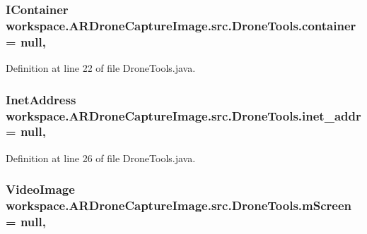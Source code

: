 \subsubsection[{container}]{\setlength{\rightskip}{0pt plus 5cm}I\+Container workspace.\+A\+R\+Drone\+Capture\+Image.\+src.\+Drone\+Tools.\+container = null\hspace{0.3cm}{\ttfamily [static]}, {\ttfamily [private]}}\label{classworkspace_1_1_a_r_drone_capture_image_1_1src_1_1_drone_tools_a1c1b1c9966fa3b80bb679d60c9b93c4d}


Definition at line 22 of file Drone\+Tools.\+java.

\hypertarget{classworkspace_1_1_a_r_drone_capture_image_1_1src_1_1_drone_tools_a537370a44b88d1ed55ee857b7dbf97e1}{}
\subsubsection[{inet\+\_\+addr}]{\setlength{\rightskip}{0pt plus 5cm}Inet\+Address workspace.\+A\+R\+Drone\+Capture\+Image.\+src.\+Drone\+Tools.\+inet\+\_\+addr = null\hspace{0.3cm}{\ttfamily [static]}, {\ttfamily [private]}}\label{classworkspace_1_1_a_r_drone_capture_image_1_1src_1_1_drone_tools_a537370a44b88d1ed55ee857b7dbf97e1}


Definition at line 26 of file Drone\+Tools.\+java.

\hypertarget{classworkspace_1_1_a_r_drone_capture_image_1_1src_1_1_drone_tools_aabc23d2e4df71856499ccdfd2d494876}{}
\subsubsection[{m\+Screen}]{\setlength{\rightskip}{0pt plus 5cm}Video\+Image workspace.\+A\+R\+Drone\+Capture\+Image.\+src.\+Drone\+Tools.\+m\+Screen = null\hspace{0.3cm}{\ttfamily [static]}, {\ttfamily [private]}}\label{classworkspace_1_1_a_r_drone_capture_image_1_1src_1_1_drone_tools_aabc23d2e4df71856499ccdfd2d494876}


